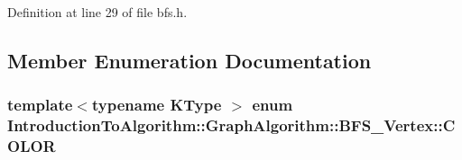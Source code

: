 Definition at line 29 of file bfs.\+h.



\subsection{Member Enumeration Documentation}
\hypertarget{struct_introduction_to_algorithm_1_1_graph_algorithm_1_1_b_f_s___vertex_a3f00f12565def71750f1f163e0e52305}{}
\subsubsection[{C\+O\+L\+O\+R}]{\setlength{\rightskip}{0pt plus 5cm}template$<$typename K\+Type $>$ enum {\bf Introduction\+To\+Algorithm\+::\+Graph\+Algorithm\+::\+B\+F\+S\+\_\+\+Vertex\+::\+C\+O\+L\+O\+R}\hspace{0.3cm}{\ttfamily [strong]}}\label{struct_introduction_to_algorithm_1_1_graph_algorithm_1_1_b_f_s___vertex_a3f00f12565def71750f1f163e0e52305}
